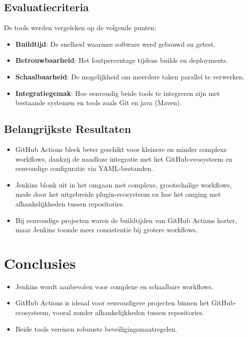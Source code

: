 \documentclass[a0,portrait]{hogent-poster}
\begin{document}
\begin{multicols}{2}
        \subsection*{Evaluatiecriteria}
        De tools werden vergeleken op de volgende punten:
        \begin{itemize}
            \item \textbf{Buildtijd}: De snelheid waarmee software werd gebouwd en getest.
            \item \textbf{Betrouwbaarheid}: Het foutpercentage tijdens builds en deployments.
            \item \textbf{Schaalbaarheid}: De mogelijkheid om meerdere taken parallel te verwerken.
            \item \textbf{Integratiegemak}: Hoe eenvoudig beide tools te integreren zijn met bestaande systemen en tools zoals Git en java (Maven).
        \end{itemize}
        
        \subsection*{Belangrijkste Resultaten}
        \begin{itemize}
            \item GitHub Actions bleek beter geschikt voor kleinere en minder complexe workflows, dankzij de naadloze integratie met het GitHub-ecosysteem en eenvoudige configuratie via YAML-bestanden.
            \item Jenkins blonk uit in het omgaan met complexe, grootschalige workflows, mede door het uitgebreide plugin-ecosysteem en hoe het omging met afhankelijkheden tussen repositories.
            \item Bij eenvoudige projecten waren de buildtijden van GitHub Actions korter, maar Jenkins toonde meer consistentie bij grotere workflows.
        \end{itemize}
        
        \section*{Conclusies}
        \begin{itemize}
            \item Jenkins wordt aanbevolen voor complexe en schaalbare workflows.
            \item GitHub Actions is ideaal voor eenvoudigere projecten binnen het GitHub-ecosysteem, vooral zonder afhankelijkheden tussen repositories.
            \item Beide tools vereisen robuuste beveiligingsmaatregelen.
        \end{itemize}
        

\end{multicols}
\end{document}
